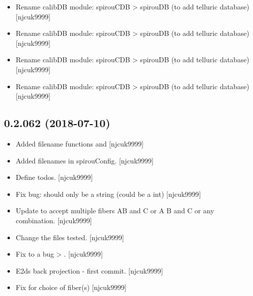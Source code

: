 \documentclass[a4paper,10pt,english]{report}
\begin{document}
\begin{itemize}
\item {} 
Rename calibDB module: spirouCDB \textendash{}\textgreater{} spirouDB (to add telluric
database) {[}njcuk9999{]}

\item {} 
Rename calibDB module: spirouCDB \textendash{}\textgreater{} spirouDB (to add telluric
database) {[}njcuk9999{]}

\item {} 
Rename calibDB module: spirouCDB \textendash{}\textgreater{} spirouDB (to add telluric
database) {[}njcuk9999{]}

\item {} 
Rename calibDB module: spirouCDB \textendash{}\textgreater{} spirouDB (to add telluric
database) {[}njcuk9999{]}

\end{itemize}


\subsection{0.2.062 (2018-07-10)}
\label{\detokenize{misc/changelog:id398}}\begin{itemize}
\item {} 
Added filename functions  and 
{[}njcuk9999{]}

\item {} 
Added filenames in spirouConfig. {[}njcuk9999{]}

\item {} 
Define todos. {[}njcuk9999{]}

\item {} 
Fix bug:  should only be a string (could be a int)
{[}njcuk9999{]}

\item {} 
Update to accept multiple fibers AB and C or A B and C or any
combination. {[}njcuk9999{]}

\item {} 
Change the files tested. {[}njcuk9999{]}

\item {} 
Fix to a bug  \textendash{}\textgreater{} . {[}njcuk9999{]}

\item {} 
E2ds back projection - first commit. {[}njcuk9999{]}

\item {} 
Fix for choice of fiber(s) {[}njcuk9999{]}

\end{itemize}
\end{document}
